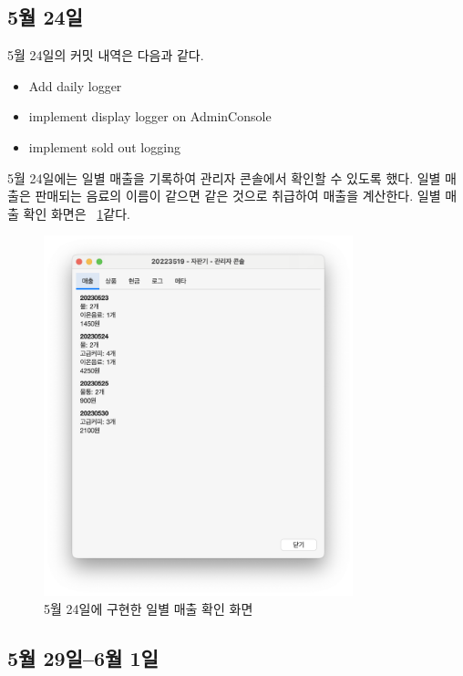 \documentclass{oblivoir}
\newcommand{\figref}[1]{\figurename~\ref{#1}}
\begin{document}
    \subsection{5월 24일}

    5월 24일의 커밋 내역은 다음과 같다.
    \begin{itemize}
        \item Add daily logger
        \item implement display logger on AdminConsole
        \item implement sold out logging
    \end{itemize}

    5월 24일에는 일별 매출을 기록하여 관리자 콘솔에서 확인할 수 있도록 했다.
    일별 매출은 판매되는 음료의 이름이 같으면 같은 것으로 취급하여 매출을 계산한다.
    일별 매출 확인 화면은 \figref{fig:0524-daily-log}\와 같다.
    \begin{figure}[h]
        \centering
        \includegraphics[width=0.8\textwidth]{images/dev-snapshop/0524-daily-log}
        \caption{5월 24일에 구현한 일별 매출 확인 화면}
        \label{fig:0524-daily-log}
    \end{figure}

    \subsection{5월 29일--6월 1일}
\end{document}
